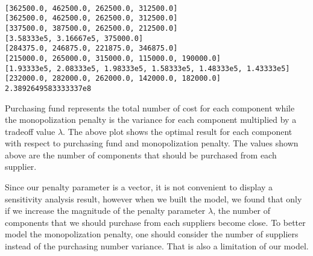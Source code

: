 \documentclass[11pt]{article}
\begin{document}
    \begin{center}
    \end{center}
    { \hspace*{\fill} \\}
    
    \begin{Verbatim}[commandchars=\\\{\}]
[362500.0, 462500.0, 262500.0, 312500.0]
[362500.0, 462500.0, 262500.0, 312500.0]
[337500.0, 387500.0, 262500.0, 212500.0]
[3.58333e5, 3.16667e5, 375000.0]
[284375.0, 246875.0, 221875.0, 346875.0]
[215000.0, 265000.0, 315000.0, 115000.0, 190000.0]
[1.93333e5, 2.08333e5, 1.98333e5, 1.58333e5, 1.48333e5, 1.43333e5]
[232000.0, 282000.0, 262000.0, 142000.0, 182000.0]
2.3892649583333337e8

    \end{Verbatim}

    Purchasing fund represents the total number of cost for each component
while the monopolization penalty is the variance for each component
multiplied by a tradeoff value \(\lambda\). The above plot shows the
optimal result for each component with respect to purchasing fund and
monopolization penalty. The values shown above are the number of
components that should be purchased from each supplier.

Since our penalty parameter is a vector, it is not convenient to display
a sensitivity analysis result, however when we built the model, we found
that only if we increase the magnitude of the penalty parameter
\(\lambda\), the number of components that we should purchase from each
suppliers become close. To better model the monopolization penalty, one
should consider the number of suppliers instead of the purchasing number
variance. That is also a limitation of our model.
\end{document}
